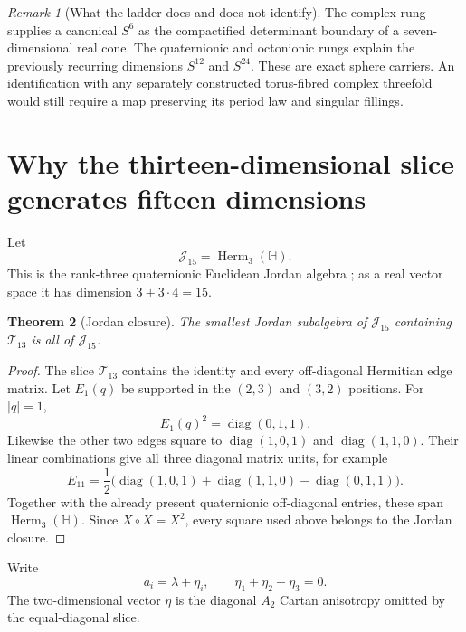 \documentclass[11pt]{article}
\newtheorem{theorem}{Theorem}[section]
\theoremstyle{definition}
\theoremstyle{remark}
\newtheorem{remark}[theorem]{Remark}
\newcommand{\Hh}{\mathbb H}
\newcommand{\Herm}{\operatorname{Herm}}
\newcommand{\diag}{\operatorname{diag}}
\newcommand{\cT}{\mathcal T}
\newcommand{\cJ}{\mathcal J}
\begin{document}
\begin{remark}[What the ladder does and does not identify]
The complex rung supplies a canonical $S^6$ as the compactified determinant boundary of a seven-dimensional real cone.  The quaternionic and octonionic rungs explain the previously recurring dimensions $S^{12}$ and $S^{24}$.  These are exact sphere carriers.  An identification with any separately constructed torus-fibred complex threefold would still require a map preserving its period law and singular fillings.
\end{remark}

\section{Why the thirteen-dimensional slice generates fifteen dimensions}

Let
\[
 \cJ_{15}=\Herm_3(\Hh).
\]
This is the rank-three quaternionic Euclidean Jordan algebra
\cite{JvNW,Gunnells}; as a real vector space it has dimension
$3+3\cdot4=15$.

\begin{theorem}[Jordan closure]\label{thm:Jordan-closure}
The smallest Jordan subalgebra of $\cJ_{15}$ containing $\cT_{13}$ is all of $\cJ_{15}$.
\end{theorem}

\begin{proof}
The slice $\cT_{13}$ contains the identity and every off-diagonal Hermitian edge matrix.  Let $E_1(q)$ be supported in the $(2,3)$ and $(3,2)$ positions.  For $|q|=1$,
\[
 E_1(q)^2=\diag(0,1,1).
\]
Likewise the other two edges square to $\diag(1,0,1)$ and $\diag(1,1,0)$.  Their linear combinations give all three diagonal matrix units, for example
\[
 E_{11}=\frac12\bigl(\diag(1,0,1)+\diag(1,1,0)-\diag(0,1,1)\bigr).
\]
Together with the already present quaternionic off-diagonal entries, these span $\Herm_3(\Hh)$.  Since $X\circ X=X^2$, every square used above belongs to the Jordan closure.
\end{proof}

Write
\begin{equation}\label{eq:diagonal-anisotropy}
 a_i=\lambda+\eta_i,
 \qquad \eta_1+\eta_2+\eta_3=0.
\end{equation}
The two-dimensional vector $\eta$ is the diagonal $A_2$ Cartan anisotropy omitted by the equal-diagonal slice.
\end{document}
